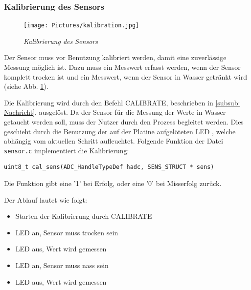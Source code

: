   

  \subsubsection{Kalibrierung des Sensors}

  \begin{figure}
     \vspace{-\baselineskip}
         \centering
         \texttt{[image: Pictures/kalibration.jpg]}
         \caption{\textit{Kalibrierung des Sensors}}
         \label{img:Kalibrierung}
  \end{figure} 
  Der Sensor muss vor Benutzung kalibriert werden, damit eine zuverlässige Messung möglich ist. Dazu muss ein Messwert erfasst werden, wenn der Sensor komplett trocken
  ist und ein Messwert, wenn der Sensor in Wasser getränkt wird (siehe Abb. \ref{img:Kalibrierung})\citep{Sensor}. 

  \smallskip

  Die Kalibrierung wird durch den Befehl CALIBRATE, beschrieben in \ref{subsub: Nachricht}, ausgelöst. Da der Sensor für die Messung der Werte in Wasser getaucht werden soll,
  muss der Nutzer durch den Prozess begleitet werden. Dies geschieht durch die Benutzung der auf der Platine aufgelöteten LED \citep{IoTGateway}, welche abhängig vom aktuellen
  Schritt aufleuchtet. 
  Folgende Funktion der Datei \lstinline!sensor.c! implementiert die Kalibrierung:
  
  \begin{lstlisting}[caption={\textit{Funktion Kalibrierung}}]
    uint8_t cal_sens(ADC_HandleTypeDef hadc, SENS_STRUCT * sens)
  \end{lstlisting}
  
  Die Funktion gibt eine '1' bei Erfolg, oder eine '0' bei Misserfolg zurück.
  
  \smallskip

  Der Ablauf lautet wie folgt:
  \begin{itemize}
      \item Starten der Kalibrierung durch CALIBRATE
      \item LED an, Sensor muss trocken sein
      \item LED aus, Wert wird gemessen
      \item LED an, Sensor muss nass sein
      \item LED aus, Wert wird gemessen 
  \end{itemize}

